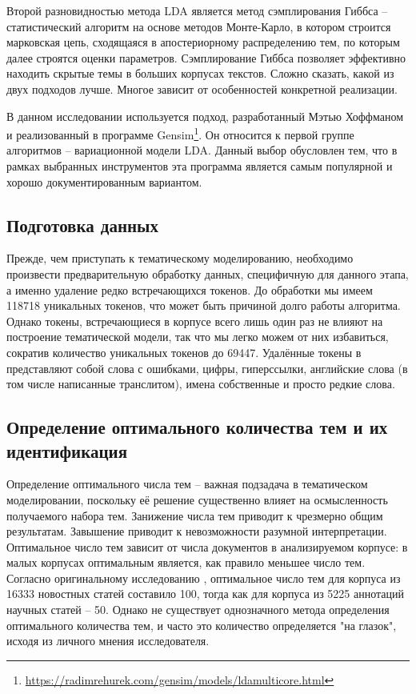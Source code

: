 Второй разновидностью метода LDA является метод сэмплирования Гиббса -- статистический алгоритм на основе методов Монте-Карло, в котором строится марковская цепь, сходящаяся в апостериорному распределению тем, по которым далее строятся оценки параметров. Сэмплирование Гиббса позволяет эффективно находить скрытые темы в больших корпусах текстов. Сложно сказать, какой из двух подходов лучше. Многое зависит от особенностей конкретной реализации.

В данном исследовании используется подход, разработанный Мэтью Хоффманом \cite{HoffmanBB10} и реализованный в программе Gensim\footnote{\href{https://radimrehurek.com/gensim/models/ldamulticore.html}{https://radimrehurek.com/gensim/models/ldamulticore.html}}. Он относится к первой группе алгоритмов -- вариационной модели LDA. Данный выбор обусловлен тем, что в рамках выбранных инструментов эта программа является самым популярной и хорошо документированным вариантом.


\subsection{Подготовка данных}
Прежде, чем приступать к тематическому моделированию, необходимо произвести предварительную обработку данных, специфичную для данного этапа, а именно удаление редко встречающихся токенов. До обработки мы имеем 118718 уникальных токенов, что может быть причиной долго работы алгоритма. Однако токены, встречающиеся в корпусе всего лишь один раз не влияют на построение тематической модели, так что мы легко можем от них избавиться, сократив количество уникальных токенов до 69447. Удалённые токены в представляют собой слова с ошибками, цифры, гиперссылки, английские слова (в том числе написанные транслитом), имена собственные и просто редкие слова.

\subsection{Определение оптимального количества тем и их идентификация}
Определение оптимального числа тем -- важная подзадача в тематическом моделировании, поскольку её решение существенно влияет на осмысленность получаемого набора тем. Занижение числа тем приводит к чрезмерно общим результатам. Завышение приводит к невозможности разумной интерпретации. Оптимальное число тем зависит от числа документов в анализируемом корпусе: в малых корпусах оптимальным является, как правило меньшее число тем. Согласно оригинальному исследованию \cite{LDAOrigin}, оптимальное число тем для корпуса из 16333 новостных статей составило 100, тогда как для корпуса из 5225 аннотаций научных статей -- 50. Однако не существует однозначного метода определения оптимального количества тем, и часто это количество определяется "на глазок", исходя из личного мнения исследователя. 


